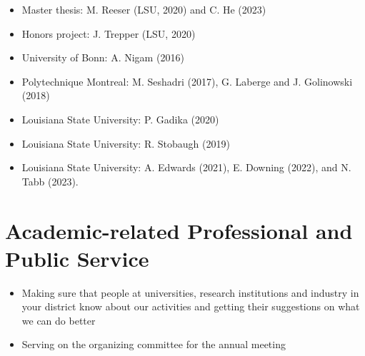\documentclass[11pt,a4paper,sans]{moderncv}
\begin{document}
\begin{itemize}[leftmargin=4cm]
\item Master thesis: M. Reeser (LSU, 2020) and C. He (2023)
\item Honors project: J. Trepper (LSU, 2020)
\end{itemize}

\begin{itemize}[leftmargin=4cm]
\item University of Bonn: A. Nigam (2016)
\item Polytechnique Montreal:  M. Seshadri (2017), G. Laberge and J. Golinowski (2018)
\item Louisiana State University: P. Gadika (2020)
\end{itemize}

\begin{itemize}[leftmargin=4cm]
\item Louisiana State University: R. Stobaugh (2019)
\end{itemize}

\begin{itemize}[leftmargin=4cm]
\item Louisiana State University: A. Edwards (2021), E. Downing (2022), and N. Tabb (2023).
\end{itemize}


\section{Academic-related Professional and Public Service}

\begin{itemize}[leftmargin=4cm]
\item Making sure that people at universities, research institutions and industry in your district know
  about our activities and getting their suggestions on what we can do better
\item Serving on the organizing committee for the annual meeting
\end{itemize}
\end{document}
